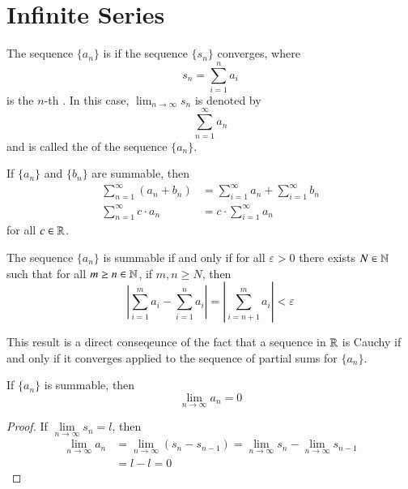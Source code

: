\section{Infinite Series}

\begin{defn}
    The sequence $\{a_n\}$ is  if the sequence $\{s_n\}$ converges, where \begin{equation*}
        s_n = \sum\limits_{i=1}^na_i
    \end{equation*}
    is the $n$-th . In this case, $\lim_{n\rightarrow \infty}s_n$ is denoted by \begin{equation*}
        \sum\limits_{n=1}^{\infty}a_n
    \end{equation*}
    and is called the  of the sequence $\{a_n\}$.
\end{defn}

\begin{rmk}
    If $\{a_n\}$ and $\{b_n\}$ are summable, then \begin{align*}
        \sum\limits_{n=1}^{\infty}(a_n+b_n) &= \sum\limits_{i=1}^{\infty}a_n + \sum\limits_{i=1}^{\infty}b_n \\
        \sum\limits_{n=1}^{\infty}c\cdot a_n &= c\cdot\sum\limits_{i=1}^{\infty}a_n
    \end{align*}
    for all $c \in \mathbb R$. 
\end{rmk}

\begin{namthm}\label{thmname:cauchcrit}
    The sequence $\{a_n\}$ is summable if and only if for all $\varepsilon > 0$ there exists $N \in \mathbb N$ such that for all $m \geq n \in \mathbb N$, if $m,n \geq N$, then \begin{equation*}
        \left|\sum\limits_{i=1}^ma_i - \sum\limits_{i=1}^na_i\right| = \left|\sum\limits_{i=n+1}^ma_i\right| <\varepsilon
    \end{equation*}
\end{namthm}

\begin{rmk}
    This result is a direct conseqeunce of the fact that a sequence in $\mathbb R$ is Cauchy if and only if it converges applied to the sequence of partial sums for $\{a_n\}$.
\end{rmk}


\begin{namthm}
    If $\{a_n\}$ is summable, then \begin{equation*}
        \lim\limits_{n\rightarrow \infty}a_n = 0
    \end{equation*}
\end{namthm}
\begin{proof}
    If $\lim\limits_{n\rightarrow \infty}s_n = l$, then \begin{align*}
        \lim\limits_{n\rightarrow \infty}a_n &= \lim\limits_{n\rightarrow \infty}(s_n - s_{n-1}) = \lim\limits_{n\rightarrow \infty}s_n - \lim\limits_{n\rightarrow \infty}s_{n-1} \\
        &= l - l = 0
    \end{align*}
\end{proof}

